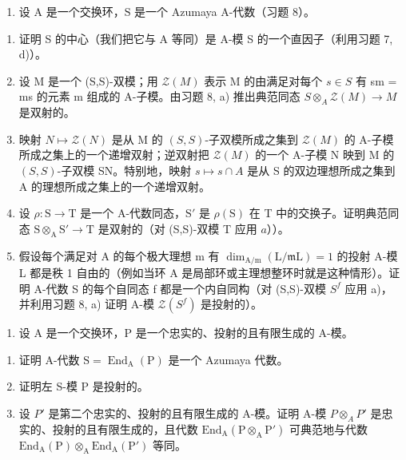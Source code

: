 \begin{enumerate}
\def\labelenumi{\arabic{enumi})}
\setcounter{enumi}{8}
\tightlist
\item
  设 \(\mathrm{A}\) 是一个交换环，\(\mathrm{S}\) 是一个 Azumaya A-代数（习题 8）。
\end{enumerate}

\begin{enumerate}
\def\labelenumi{\alph{enumi})}
\item
  证明 S 的中心（我们把它与 A 等同）是 A-模 S 的一个直因子（利用习题 7, d)）。
\item
  设 M 是一个 (S,S)-双模；用 \(\mathcal{Z}(M)\) 表示 M 的由满足对每个 \(s \in S\) 有 sm = ms 的元素 m 组成的 A-子模。由习题 8, a) 推出典范同态 \(S \otimes_{A} \mathcal{Z}(M) \to M\) 是双射的。
\item
  映射 \(N \mapsto \mathcal{Z}(N)\) 是从 M 的 \((S, S)\)-子双模所成之集到 \(\mathcal{Z}(M)\) 的 A-子模所成之集上的一个递增双射；逆双射把 \(\mathcal{Z}(M)\) 的一个 A-子模 N 映到 M 的 \((S, S)\)-子双模 SN。特别地，映射 \(s \mapsto s \cap A\) 是从 S 的双边理想所成之集到 A 的理想所成之集上的一个递增双射。
\item
  设 \(\rho : \mathrm{S} \to \mathrm{T}\) 是一个 A-代数同态，\(\mathrm{S}'\) 是 \(\rho(\mathrm{S})\) 在 T 中的交换子。证明典范同态 \(\mathrm{S} \otimes_{\mathrm{A}} \mathrm{S}' \to \mathrm{T}\) 是双射的（对 (S,S)-双模 T 应用 \(a\)））。
\item
  假设每个满足对 A 的每个极大理想 m 有 \(\dim_{\mathrm{A/m}}(\mathrm{L}/\mathfrak{m}\mathrm{L}) = 1\) 的投射 A-模 L 都是秩 1 自由的（例如当环 A 是局部环或主理想整环时就是这种情形）。证明 A-代数 S 的每个自同态 f 都是一个内自同构（对 (S,S)-双模 \(S^{f}\) 应用 a)，并利用习题 8, a) 证明 A-模 \(\mathcal{Z}(S^{f})\) 是投射的）。
\end{enumerate}

\begin{enumerate}
\def\labelenumi{\arabic{enumi})}
\setcounter{enumi}{9}
\tightlist
\item
  设 A 是一个交换环，P 是一个忠实的、投射的且有限生成的 A-模。
\end{enumerate}

\begin{enumerate}
\def\labelenumi{\alph{enumi})}
\item
  证明 A-代数 \(\mathrm{S} = \operatorname{End}_{\mathrm{A}}(\mathrm{P})\) 是一个 Azumaya 代数。
\item
  证明左 S-模 P 是投射的。
\item
  设 \(P'\) 是第二个忠实的、投射的且有限生成的 A-模。证明 A-模 \(P \otimes_{A} P'\) 是忠实的、投射的且有限生成的，且代数 \(\text{End}_{\text{A}}(\text{P} \otimes_{\text{A}} \text{P}')\) 可典范地与代数 \(\text{End}_{\text{A}}(\text{P}) \otimes_{\text{A}} \text{End}_{\text{A}}(\text{P}')\) 等同。
\end{enumerate}

